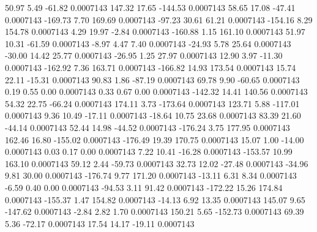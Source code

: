        50.97        5.49      -61.82     0.0007143
      147.32       17.65     -144.53     0.0007143
       58.65       17.08      -47.41     0.0007143
     -169.73        7.70      169.69     0.0007143
      -97.23       30.61       61.21     0.0007143
     -154.16        8.29      154.78     0.0007143
        4.29       19.97       -2.84     0.0007143
     -160.88        1.15      161.10     0.0007143
       51.97       10.31      -61.59     0.0007143
       -8.97        4.47        7.40     0.0007143
      -24.93        5.78       25.64     0.0007143
      -30.00       14.42       25.77     0.0007143
      -26.95        1.25       27.97     0.0007143
       12.90        3.97      -11.30     0.0007143
     -162.92        7.36      163.71     0.0007143
     -166.82       14.93      173.54     0.0007143
       15.74       22.11      -15.31     0.0007143
       90.83        1.86      -87.19     0.0007143
       69.78        9.90      -60.65     0.0007143
        0.19        0.55        0.00     0.0007143
        0.33        0.67        0.00     0.0007143
     -142.32       14.41      140.56     0.0007143
       54.32       22.75      -66.24     0.0007143
      174.11        3.73     -173.64     0.0007143
      123.71        5.88     -117.01     0.0007143
        9.36       10.49      -17.11     0.0007143
      -18.64       10.75       23.68     0.0007143
       83.39       21.60      -44.14     0.0007143
       52.44       14.98      -44.52     0.0007143
     -176.24        3.75      177.95     0.0007143
      162.46       16.80     -155.02     0.0007143
     -176.49       19.39      170.75     0.0007143
       15.07        1.00      -14.00     0.0007143
        0.03        0.17        0.00     0.0007143
        7.22       10.41      -16.28     0.0007143
     -153.57       10.99      163.10     0.0007143
       59.12        2.44      -59.73     0.0007143
       32.73       12.02      -27.48     0.0007143
      -34.96        9.81       30.00     0.0007143
     -176.74        9.77      171.20     0.0007143
      -13.11        6.31        8.34     0.0007143
       -6.59        0.40        0.00     0.0007143
      -94.53        3.11       91.42     0.0007143
     -172.22       15.26      174.84     0.0007143
     -155.37        1.47      154.82     0.0007143
      -14.13        6.92       13.35     0.0007143
      145.07        9.65     -147.62     0.0007143
       -2.84        2.82        1.70     0.0007143
      150.21        5.65     -152.73     0.0007143
       69.39        5.36      -72.17     0.0007143
       17.54       14.17      -19.11     0.0007143

